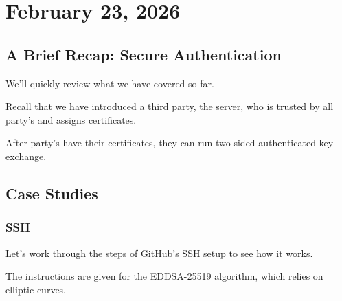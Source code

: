\section{February 23, 2026}
\label{20260223}

\subsection{A Brief Recap: Secure Authentication}

We'll quickly review what we have covered so far.

Recall that we have introduced a third party, the server, who is trusted by all party's and assigns certificates.


After party's have their certificates, they can run two-sided authenticated key-exchange.


\subsection{Case Studies}

\subsubsection{SSH}


Let's work through the steps of GitHub's SSH setup to see how it works.

The instructions are given for the EDDSA-25519 algorithm, which relies on elliptic curves.

